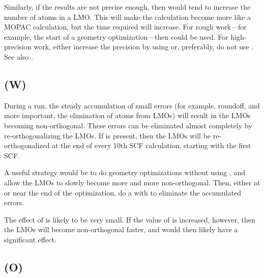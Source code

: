 Similarly, if the results are not precise enough, then  would
tend to increase the number of atoms in a LMO.  This will make the calculation
become more like a MOPAC calculation, but the time required will increase.
For rough work---for example, the start of a geometry optimization---then
 could be used.  For high-precision work, either increase
the precision by using  or, preferably, do not use .
 See also .

\subsection*{ (W)}
During a  run, the steady accumulation of small errors (for example,
roundoff, and more important, the elimination of atoms from LMOs) will
result in the LMOs becoming non-orthogonal.  These errors can be eliminated
almost completely by re-orthogonalizing the LMOs.  If 
is present, then the LMOs will be re-orthogonalized at the end of every
10th SCF calculation, starting with the first SCF.

A useful strategy would be to do geometry optimizations without using
, and allow the LMOs to slowly become more and more non-orthogonal.
Then, either at or near the end of the optimization, do a  with
 to eliminate the accumulated errors.

The effect of  is likely to be very small.  If the value of 
is increased, however, then the LMOs will become non-orthogonal faster, and
 would then likely have a significant effect.

\subsection*{ (O)}
\label{res}

